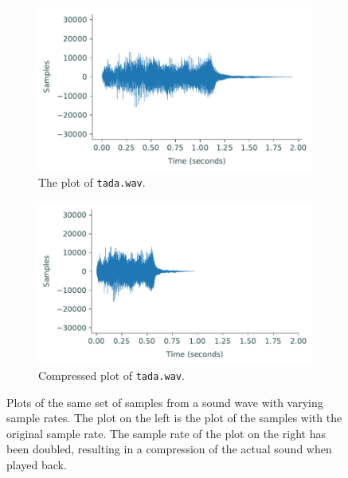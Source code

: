 \begin{figure}[H]
\captionsetup[subfigure]{justification=centering}
\centering
\begin{subfigure}{.425\textwidth}
    \centering
    \includegraphics[width=\linewidth]{figures/tada.pdf}
    \caption{The plot of \texttt{tada.wav}.}
    \label{fig:DFT_tada}
\end{subfigure}
\qquad
\begin{subfigure}{.425\textwidth}
    \centering
    \includegraphics[width=\linewidth]{figures/fast_tada.pdf}
    \caption{Compressed plot of \texttt{tada.wav}.}
    \label{fig:DFT_fasttada}
\end{subfigure}
\caption{Plots of the same set of samples from a sound wave with varying sample rates.
The plot on the left is the plot of the samples with the original sample rate.
The sample rate of the plot on the right has been doubled, resulting in a compression of the actual sound when played back.}
\label{fig:DFT_comp_wave}
\end{figure}

